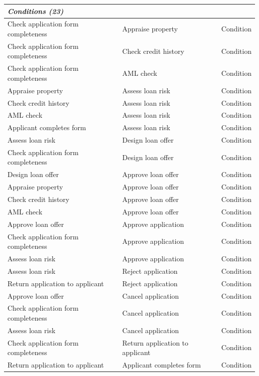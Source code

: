 \begin{longtable}{p{5.5cm} p{5.5cm} p{2cm}}
\multicolumn{3}{l}{\textit{Conditions (23)}} \\
\midrule
Check application form completeness & Appraise property & Condition \\
Check application form completeness & Check credit history & Condition \\
Check application form completeness & AML check & Condition \\
Appraise property & Assess loan risk & Condition \\
Check credit history & Assess loan risk & Condition \\
AML check & Assess loan risk & Condition \\
Applicant completes form & Assess loan risk & Condition \\
Assess loan risk & Design loan offer & Condition \\
Check application form completeness & Design loan offer & Condition \\
Design loan offer & Approve loan offer & Condition \\
Appraise property & Approve loan offer & Condition \\
Check credit history & Approve loan offer & Condition \\
AML check & Approve loan offer & Condition \\
Approve loan offer & Approve application & Condition \\
Check application form completeness & Approve application & Condition \\
Assess loan risk & Approve application & Condition \\
Assess loan risk & Reject application & Condition \\
Return application to applicant & Reject application & Condition \\
Approve loan offer & Cancel application & Condition \\
Check application form completeness & Cancel application & Condition \\
Assess loan risk & Cancel application & Condition \\
Check application form completeness & Return application to applicant & Condition \\
Return application to applicant & Applicant completes form & Condition \\


\end{longtable}
